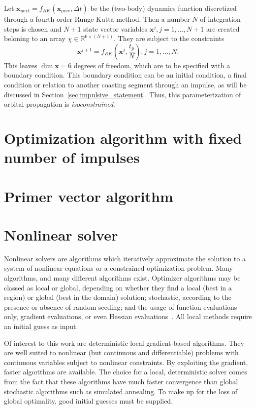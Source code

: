 Let \(\mathbf{x}_{\text{next}} = f_{RK}(\mathbf{x}_{\text{prev}}, \Delta t)\) be the (two-body) dynamics function discretized through a fourth order Runge Kutta method. Then a number \(N\) of integration steps is chosen and \(N+1\) state vector variables \(\mathbf{x}^j, j=1,\dots,N+1\) are created beloning to an array \(\chi \in \mathbb{R}^{6 \times (N+1)}\). They are subject to the constraints
\begin{equation}
    \mathbf{x}^{j+1} = f_{RK}(\mathbf{x}^j, \frac{t_p}{N}), j = 1, \dots, N.
\end{equation}
This leaves \(\dim \mathbf{x} = 6\) degrees of freedom, which are to be specified with a boundary condition. This boundary condition can be an initial condition, a final condition or relation to another coasting segment through an impulse, as will be discussed in Section~\ref{sec:impulsive_statement}. Thus, this parameterization of orbital propagation is \textit{isoconstrained}.


\section{Optimization algorithm with fixed number of impulses}

\section{Primer vector algorithm}

\section{Nonlinear solver}

Nonlinear solvers are algorithms which iteratively approximate the solution to a system of nonlinear equations or a constrained optimization problem. Many algorithms, and many different algorithms exist. Optimizer algorithms may be classed as local or global, depending on whether they find a local (best in a region) or global (best in the domain) solution; stochastic, according to the presence or absence of random seeding; and the usage of function evaluations only, gradient evaluations, or even Hessian evaluations~\cite{numerical_recipes}. All local methods require an initial guess as input.

Of interest to this work are deterministic local gradient-based algorithms. They are well suited to nonlinear (but continuous and differentiable) problems with continuous variables subject to nonlinear constraints. By exploiting the gradient, faster algorithms are available. The choice for a local, deterministic solver comes from the fact that these algorithms have much faster convergence than global stochastic algorithms such as simulated annealing. To make up for the loss of global optimality, good initial guesses must be supplied.

